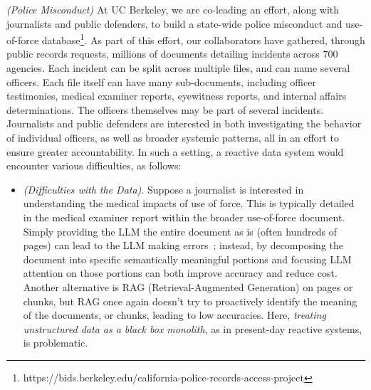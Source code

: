 \begin{example}\label{ex:police}\textit{(Police Misconduct)}
     At UC Berkeley, we are co-leading an effort, along with journalists and public defenders, to build a state-wide police misconduct and use-of-force database\footnote{https://bids.berkeley.edu/california-police-records-access-project}. 
     As part of this effort, our collaborators have gathered, through public records requests, millions of documents detailing
     incidents across 700 agencies.
     Each incident can be split across multiple files, and can
     name several officers.
      Each file itself
     can have many sub-documents, including
     officer testimonies, medical examiner reports, 
     eyewitness reports, and internal affairs determinations.
     The officers
     themselves may be part of several incidents.
     Journalists and public defenders are 
     interested in both investigating the behavior of 
     individual officers,
     as well as broader systemic patterns,
     all in an effort to ensure greater accountability. 
     In such a setting, a reactive data system would 
     encounter various difficulties, as follows:
     \begin{itemize}
         \item \textit{(Difficulties with the Data)}.
         Suppose a journalist is interested in understanding
         the medical impacts of use of force. This is typically 
         detailed in the medical examiner report within
         the broader use-of-force document. 
         Simply providing the LLM the entire 
         document as is (often hundreds of pages) 
         can lead to the LLM making errors~\cite{liu2024lost};
         instead, by decomposing the document into specific semantically meaningful portions
         and focusing LLM attention on those portions
         can both improve accuracy and reduce cost. 
         Another alternative is RAG (Retrieval-Augmented Generation) 
         on pages or chunks, but RAG once again doesn't try to proactively identify 
         the meaning of the documents, or chunks, 
         leading to low accuracies. 
         Here, {\em treating unstructured data as a black box 
         monolith}, as in present-day reactive systems,
         is problematic.


\end{itemize}
\end{example}
